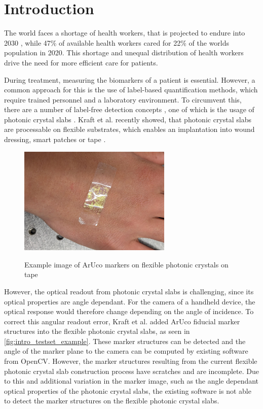 \documentclass[10pt]{book}
\begin{document}
\tableofcontents
\listoffigures
\mainmatter
\chapter{Introduction}

The world faces a shortage of health workers, that is projected to endure into 2030 \cite{BMJHealthWorkforce22}, while 47\% of available health workers cared for 22\% of the worlds population in 2020. This shortage and unequal distribution of health workers drive the need for more efficient care for patients. 

During treatment, measuring the biomarkers of a patient is essential. However, a common approach for this is the use of label-based quantification methods, which require trained personnel and a laboratory environment. To circumvent this, there are a number of label-free detection concepts \cite{rapp2010biosensors}, one of which is the usage of photonic crystal slabs \cite{Pitruzzello_2018}. Kraft et al. recently showed, that photonic crystal slabs are processable on flexible substrates, which enables an implantation into wound dressing, smart patches or tape \cite{Fab23}.

\begin{figure}
  \caption{Example image of \ac{ArUco} markers on flexible photonic crystals on tape}
  \includegraphics[width=0.65\textwidth]{image/testset_example_crop}
  \label{fig:intro_testset_example}
\end{figure}

However, the optical readout from photonic crystal slabs is challenging, since its optical properties are angle dependant. For the camera of a handheld device, the optical response would therefore change depending on the angle of incidence. To correct this angular readout error, Kraft et al. added \ac{ArUco} fiducial marker structures into the flexible photonic crystal slabs, as seen in \autoref{fig:intro_testset_example}. These marker structures can be detected and the angle of the marker plane to the camera can be computed by existing software from \ac{OpenCV}. However, the marker structures resulting from the current flexible photonic crystal slab construction process have scratches and are incomplete. Due to this and additional variation in the marker image, such as the angle dependant optical properties of the photonic crystal slabs, the existing software is not able to detect the marker structures on the flexible photonic crystal slabs.
\end{document}
